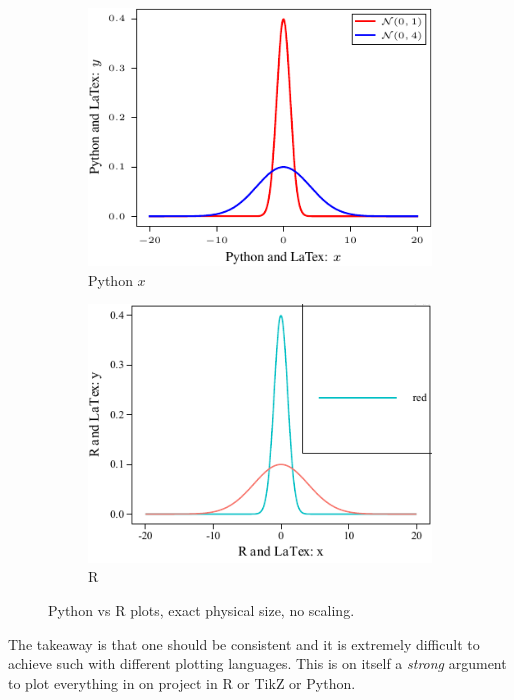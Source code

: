 \documentclass[preprint,aos]{imsart}
\begin{document}
\begin{figure}[htb]
    \centering
    \begin{subfigure}[t]{2.8in}
        \includegraphics{scatterplot-python.pdf}
        \caption{Python $x$}
    \end{subfigure}\hfill
    \begin{subfigure}[t]{2.8in}
        \includegraphics{scatterplot-R.pdf}
        \caption{R}
    \end{subfigure}

    \caption{Python vs R plots, exact physical size, no scaling.}
\end{figure}

The takeaway is that one should be consistent and it is extremely 
difficult to achieve such with different plotting languages.
This is on itself a \emph{strong} argument to plot everything 
in on project in R or TikZ or Python.
\end{document}
